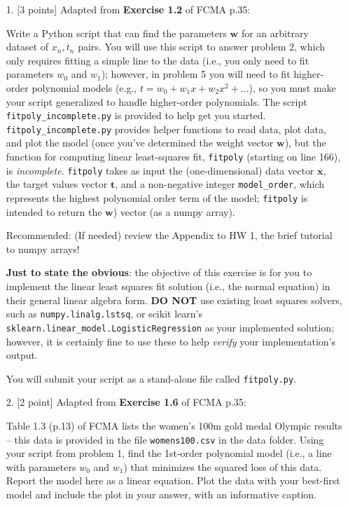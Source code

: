 \documentclass[10pt]{article}
\begin{document}
\newpage
\begin{itemize}



\item[1.] [3 points]
Adapted from {\bf Exercise 1.2} of FCMA p.35:

Write a Python script that can find the parameters $\mathbf{w}$ for an arbitrary dataset of $x_n, t_n$ pairs.  You will use this script to answer problem 2, which only requires fitting a simple line to the data (i.e., you only need to fit parameters $w_0$ and $w_1$); however, in problem 5 you will need to fit higher-order polynomial models (e.g., $t = w_0 + w_1x + w_2x^2 + ...$), so you must make your script generalized to handle higher-order polynomials.  The script {\tt fitpoly\_incomplete.py} is provided to help get you started.  {\tt fitpoly\_incomplete.py} provides helper functions to read data, plot data, and plot the model (once you've determined the weight vector $\mathbf{w}$), but the function for computing linear least-squares fit, {\tt fitpoly} (starting on line 166), is {\em incomplete}.  {\tt fitpoly} takes as input the (one-dimensional) data vector $\mathbf{x}$, the target values vector $\mathbf{t}$, and a non-negative integer {\tt model\_order}, which represents the highest polynomial order term of the model; {\tt fitpoly} is intended to return the $\mathbf{w}$) vector (as a numpy array).

Recommended: (If needed) review the Appendix to HW 1, the brief tutorial to numpy arrays!

{\bf Just to state the obvious}: the objective of this exercise is for you to implement the linear least squares fit solution (i.e., the normal equation) in their general linear algebra form.  {\bf DO NOT} use existing least squares solvers, such as {\tt numpy.linalg.lstsq}, or scikit learn's \\{\tt sklearn.linear\_model.LogisticRegression} as your implemented solution; however, it is certainly fine to use these to help {\em verify} your implementation's output.

You will submit your script as a stand-alone file called {\tt fitpoly.py}.



\item[2.] [2 point]
Adapted from {\bf Exercise 1.6} of FCMA p.35:

Table 1.3 (p.13) of FCMA lists the women's 100m gold medal Olympic results -- this data is provided in the file {\tt womens100.csv} in the data folder.  Using your script from problem 1, find the 1st-order polynomial model (i.e., a line with parameters $w_0$ and $w_1$) that minimizes the squared loss of this data.  Report the model here as a linear equation.  Plot the data with your best-first model and include the plot in your answer, with an informative caption.


\end{itemize}
\end{document}
